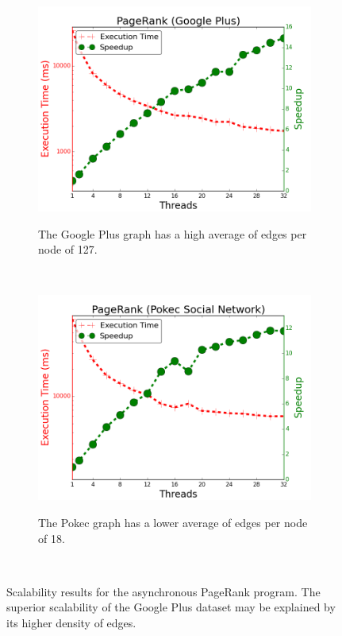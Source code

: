 \begin{figure}[]
        \begin{subfigure}[b]{\plotsize\textwidth}
                \includegraphics[width=\textwidth]{experiments/scalability/scale-pagerank-gplus.png}
                \label{fig:implementation:scale_pagerank_gplus}
                \caption{The Google Plus graph has a high average of edges per
                node of 127.}
        \end{subfigure}
        ~
        \begin{subfigure}[b]{\plotsize\textwidth}
                \includegraphics[width=\textwidth]{experiments/scalability/scale-pagerank-pokec.png}
                \label{fig:implementation:scale_pagerank_pokec}
                \caption{The Pokec graph has a lower average of edges per node
                of 18.}
        \end{subfigure}\\
        \caption{Scalability results for the asynchronous PageRank program. The
           superior scalability of the Google Plus dataset may be explained by
        its higher density of edges.}
        \label{fig:implementation:scale_pagerank}
\end{figure}
